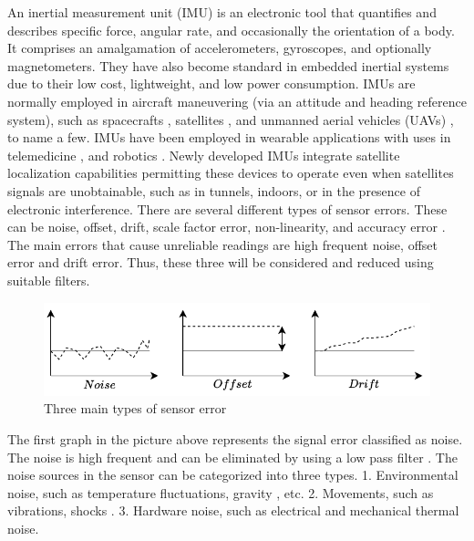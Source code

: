 An inertial measurement unit (IMU) is an electronic tool that quantifies and describes specific force, angular rate, and occasionally the orientation of a body. It comprises an amalgamation of accelerometers, gyroscopes, and optionally magnetometers. They have also become standard in embedded inertial systems due to their low cost, lightweight, and low power consumption. IMUs are normally employed in aircraft maneuvering (via an attitude and heading reference system), such as spacecrafts \cite{li2011calibration} \cite{haberberger2016imu} \cite{faragher2012understanding}, satellites \cite{lu2020orbit}, and unmanned aerial vehicles (UAVs) \cite{sahawneh2008development} \cite{eling2015real}, to name a few. IMUs have been employed in wearable applications with uses in  telemedicine \cite{madgwick2020extended} \cite{allen2013telemedicine} \cite{giansanti2009toward} \cite{o2021measuring}, and robotics \cite{wilson2019formulation}. Newly developed IMUs integrate satellite localization capabilities permitting these devices to operate even when satellites signals are unobtainable, such as in tunnels, indoors, or in the presence of electronic interference.
There are several different types of sensor errors. These can be noise, offset, drift, scale factor error, non-linearity, and accuracy error \cite{hanke2016classification}. The main errors that cause unreliable readings are high frequent noise, offset error and drift error. Thus, these three will be considered and reduced using suitable filters.

\begin{figure}[!h]
  \centering
  \includegraphics[width=1\textwidth]{figures/noise.pdf}
  \caption{Three main types of sensor error}
  \label{fig:noise}
\end{figure}

The first graph in the picture above represents the signal error classified as noise. The noise is high frequent and can be eliminated by using a low pass filter \cite{kaiser1977data}. The noise sources in the sensor can be categorized into three types.
1. Environmental noise, such as temperature fluctuations, gravity , etc.
2. Movements, such as vibrations, shocks .
3. Hardware noise, such as electrical and mechanical thermal noise.

